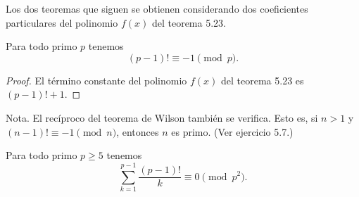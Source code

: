 \documentclass[12pt,a4paper]{book}
\begin{document}
    Los dos teoremas que siguen se obtienen considerando dos coeficientes particulares
    del polinomio $f(x)$ del teorema 5.23.

    \begin{teorema}
        Para todo primo $p$ tenemos
        \begin{equation*}
            (p-1)!\equiv-1\pmod{p}.
        \end{equation*}
    \end{teorema}

    \begin{proof}
        El término constante del polinomio $f(x)$ del teorema 5.23 es $(p-1)!+1$.
    \end{proof}

    Nota. El recíproco del teorema de Wilson también se verifica. Esto es, si $n>1$ y
    $(n-1)!\equiv-1\pmod{n}$, entonces $n$ es primo. (Ver ejercicio 5.7.)

    \begin{teorema}
        Para todo primo $p\geq5$ tenemos
        \begin{equation*}
            \sum_{k=1}^{p-1}\frac{(p-1)!}{k}\equiv0\pmod{p^{2}}.
        \end{equation*}
    \end{teorema}
\end{document}
